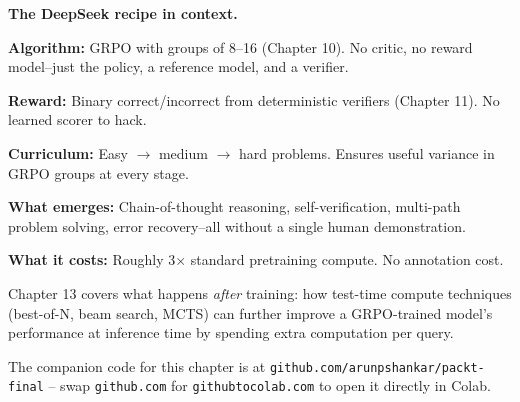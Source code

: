 \begin{chapterenv}
\begin{infobox}
\textbf{The DeepSeek recipe in context.}

\textbf{Algorithm:} GRPO with groups of 8--16 (Chapter 10). No critic, no reward model--just the policy, a reference model, and a verifier.

\textbf{Reward:} Binary correct/incorrect from deterministic verifiers (Chapter 11). No learned scorer to hack.

\textbf{Curriculum:} Easy $\to$ medium $\to$ hard problems. Ensures useful variance in GRPO groups at every stage.

\textbf{What emerges:} Chain-of-thought reasoning, self-verification, multi-path problem solving, error recovery--all without a single human demonstration.

\textbf{What it costs:} Roughly 3$\times$ standard pretraining compute. No annotation cost.

Chapter 13 covers what happens \textit{after} training: how test-time compute techniques (best-of-N, beam search, MCTS) can further improve a GRPO-trained model's performance at inference time by spending extra computation per query.
\end{infobox}


The companion code for this chapter is at \texttt{github.com/arunpshankar/packt-final} -- swap \texttt{github.com} for \texttt{githubtocolab.com} to open it directly in Colab.

\end{chapterenv}